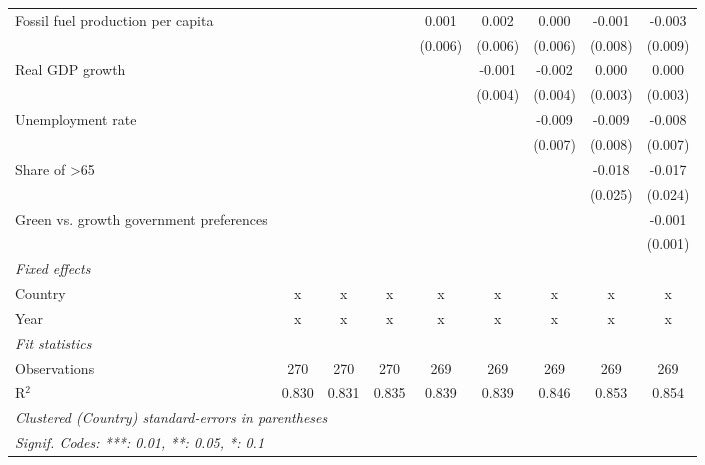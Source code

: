\begin{table}[htbp]
\begin{tabular}{lcccccccc}
      Fossil fuel production per capita       &         &         &         & 0.001   & 0.002   & 0.000   & -0.001  & -0.003\\   
                                              &         &         &         & (0.006) & (0.006) & (0.006) & (0.008) & (0.009)\\   
      Real GDP growth                         &         &         &         &         & -0.001  & -0.002  & 0.000   & 0.000\\   
                                              &         &         &         &         & (0.004) & (0.004) & (0.003) & (0.003)\\   
      Unemployment rate                       &         &         &         &         &         & -0.009  & -0.009  & -0.008\\   
                                              &         &         &         &         &         & (0.007) & (0.008) & (0.007)\\   
      Share of >65                            &         &         &         &         &         &         & -0.018  & -0.017\\   
                                              &         &         &         &         &         &         & (0.025) & (0.024)\\   
      Green vs. growth government preferences &         &         &         &         &         &         &         & -0.001\\   
                                              &         &         &         &         &         &         &         & (0.001)\\   
      \emph{Fixed effects}\\
      Country                                 & x       & x       & x       & x       & x       & x       & x       & x\\  
      Year                                    & x       & x       & x       & x       & x       & x       & x       & x\\  
      \midrule \emph{Fit statistics}\\
      Observations                            & 270     & 270     & 270     & 269     & 269     & 269     & 269     & 269\\  
      R$^2$                                   & 0.830   & 0.831   & 0.835   & 0.839   & 0.839   & 0.846   & 0.853   & 0.854\\  
      \midrule
      \multicolumn{9}{l}{\emph{Clustered (Country) standard-errors in parentheses}}\\
      \multicolumn{9}{l}{\emph{Signif. Codes: ***: 0.01, **: 0.05, *: 0.1}}\\
   \end{tabular}
\end{table}


